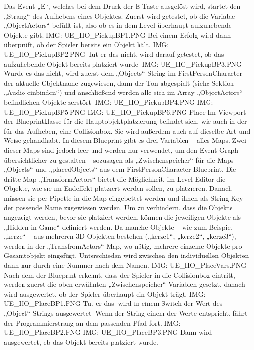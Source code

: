 Das Event „E“, welches bei dem Druck der E-Taste ausgelöst wird, startet den „Strang“ des Aufhebens eines Objektes. Zuerst wird getestet, ob die Variable „ObjectActors“ befüllt ist, also ob es in dem Level überhaupt aufzuhebende Objekte gibt.
{IMG: UE_HO_PickupBP1.PNG}
Bei einem Erfolg wird dann überprüft, ob der Spieler bereits ein Objekt hält.
{IMG: UE_HO_PickupBP2.PNG}
Tut er das nicht, wird darauf getestet, ob das aufzuhebende Objekt bereits platziert wurde.
{IMG: UE_HO_PickupBP3.PNG}
Wurde es das nicht, wird zuerst dem „Objects“ String im FirstPersonCharacter der aktuelle Objektname zugewiesen, dann der Ton abgespielt (siehe Sektion „Audio einbinden“) und anschließend werden alle sich im Array „ObjectActors“ befindlichen Objekte zerstört.
{IMG: UE_HO_PickupBP4.PNG}
{IMG: UE_HO_PickupBP5.PNG}
{IMG: UE_HO_PickupBP6.PNG}
Place
Im Viewport der Blueprintklasse für die Hauptobjektplatzierung befindet sich, wie auch in der für das Aufheben, eine Collisionbox. Sie wird außerdem auch auf dieselbe Art und Weise gehandhabt.
In diesem Blueprint gibt es drei Variablen – alles Maps. Zwei dieser Maps sind jedoch leer und werden nur verwendet, um den Event Graph übersichtlicher zu gestalten – sozusagen als „Zwischenspeicher“ für die Maps „Objects“ und „placedObjects“ aus dem FirstPersonCharacter Blueprint.
Die dritte Map „TransformActors“ bietet die Möglichkeit, im Level Editor die Objekte, wie sie im Endeffekt platziert werden sollen, zu platzieren. Danach müssen sie per Pipette in die Map eingebettet werden und ihnen als String-Key der passende Name zugewiesen werden. Um zu verhindern, dass die Objekte angezeigt werden, bevor sie platziert werden, können die jeweiligen Objekte als „Hidden in Game“ definiert werden.
Da manche Objekte – wie zum Beispiel „kerze“ – aus mehreren 3D-Objekten bestehen („kerze1“, „kerze2“, „kerze3“), werden in der „TransfromActors“ Map, wo nötig, mehrere einzelne Objekte pro Gesamtobjekt eingefügt. Unterschieden wird zwischen den individuellen Objekten dann nur durch eine Nummer nach dem Namen.
{IMG: UE_HO_PlaceVars.PNG}
Nach dem der Blueprint erkennt, dass der Spieler in die Collisionbox eintritt, werden zuerst die oben erwähnten „Zwischenspeicher“-Variablen gesetzt, danach wird ausgewertet, ob der Spieler überhaupt ein Objekt trägt.
{IMG: UE_HO_PlaceBP1.PNG}
Tut er das, wird in einem Switch der Wert des „Object“-Strings ausgewertet. Wenn der String einem der Werte entspricht, fährt der Programmierstrang an dem passenden Pfad fort.
{IMG: UE_HO_PlaceBP2.PNG}
{IMG: UE_HO_PlaceBP3.PNG}
Dann wird ausgewertet, ob das Objekt bereits platziert wurde.
